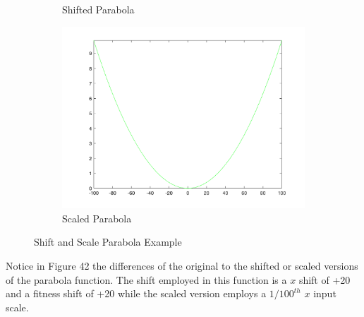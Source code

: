\begin{figure}
\begin{subfigure}[b]{0.6\textwidth}
    \caption{Shifted Parabola}
  \end{subfigure}
  \begin{subfigure}[b]{0.6\textwidth}
    \includegraphics[width=\textwidth]{img/translates/parabola/loa-graph-scale}
    \caption{Scaled Parabola}
  \end{subfigure}
  \caption{Shift and Scale Parabola Example}
\end{figure}

\par Notice in Figure 42 the differences of the original to the shifted or scaled versions of the parabola function. The shift employed in this function is a $x$ shift of +20 and a fitness shift of +20 while the scaled version employs a $1/100^{th}$ $x$ input scale.

